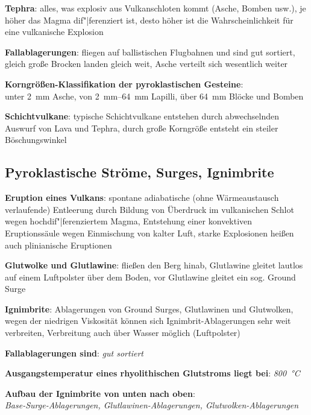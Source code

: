 \textbf{Tephra}:
alles, was explosiv aus Vulkanschloten kommt (Asche, Bomben usw.),
je höher das Magma dif"|ferenziert ist, desto höher ist die Wahrscheinlichkeit für eine
vulkanische Explosion

\textbf{Fallablagerungen}:
fliegen auf ballistischen Flugbahnen und sind gut sortiert,
gleich große Brocken landen gleich weit,
Asche verteilt sich wesentlich weiter

\textbf{Korngrößen-Klassifikation der pyroklastischen Gesteine}:\\
unter \SI{2}{\milli\meter} Asche,
von \SIrange{2}{64}{\milli\meter} Lapilli,
über \SI{64}{\milli\meter} Blöcke und Bomben

\textbf{Schichtvulkane}:
typische Schichtvulkane entstehen durch abwechselnden Auswurf von Lava und Tephra,
durch große Korngröße entsteht ein steiler Böschungswinkel

\pagebreak

\subsection{%
    Pyroklastische Ströme, Surges, Ignimbrite%
}

\textbf{Eruption eines Vulkans}:
spontane adiabatische (ohne Wärmeaustausch verlaufende) Entleerung durch
Bildung von Überdruck im vulkanischen Schlot wegen hochdif"|ferenziertem Magma,
Entstehung einer konvektiven Eruptionssäule wegen Einmischung von kalter Luft,
starke Explosionen heißen auch plinianische Eruptionen

\textbf{Glutwolke und Glutlawine}:
fließen den Berg hinab,
Glutlawine gleitet lautlos auf einem Luftpolster über dem Boden,
vor Glutlawine gleitet ein sog. Ground Surge

\textbf{Ignimbrite}:
Ablagerungen von Ground Surges, Glutlawinen und Glutwolken,
wegen der niedrigen Viskosität können sich Ignimbrit-Ablagerungen sehr weit verbreiten,
Verbreitung auch über Wasser möglich (Luftpolster)

\begin{wichtig}
    \item
    \textbf{Fallablagerungen sind}:
    \emph{gut sortiert}

    \item
    \textbf{Ausgangstemperatur eines rhyolithischen Glutstroms liegt bei}:
    \emph{\SI[math-rm=\mathit,text-rm=\itshape]{800}{\celsius}}

    \item
    \textbf{Aufbau der Ignimbrite von unten nach oben}:\\
    \emph{Base-Surge-Ablagerungen, Glutlawinen-Ablagerungen, Glutwolken-Ablagerungen}
\end{wichtig}

